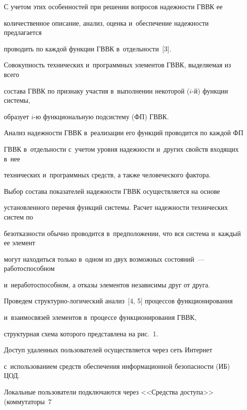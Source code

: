       

      С учетом этих особенностей при решении вопросов надежности ГВВК ее 

количественное описание, анализ, оценка и~обеспечение надежности предлагается 

проводить по каждой функции ГВВК в~отдельности~[3]. 

      

      Совокупность технических и~программных элементов ГВВК, выделяемая из всего 

состава ГВВК по признаку участия в~выполнении некоторой ($i$-й) функции системы, 

образует $i$-ю функциональную подсистему (ФП) ГВВК.

      

      Анализ надежности ГВВК в~реализации его функций проводится по каждой ФП 

ГВВК в~отдельности с~учетом уровня надежности и~других свойств входящих в~нее 

технических и~программных средств, а также человеческого фактора.

      

      Выбор состава показателей надежности ГВВК осуществляется на основе 

установленного перечня функций системы. Расчет надежности технических систем по 

безотказности обычно проводится в~предположении, что вся система и~каждый ее элемент 

могут находиться только в~одном из двух возможных состояний~--- работоспособном 

и~неработоспособном, а отказы элементов независимы друг от друга.

      

      Проведем структурно-логический анализ~[4, 5] процессов функционирования 

и~взаимосвязей элементов в~процессе функционирования ГВВК, 

структурная схема которого  представлена на рис.~1.

      



      

      Доступ удаленных пользователей осуществляется через сеть Интернет 

с~использованием средств обеспечения информационной безопасности (ИБ) ЦОД. 

Локальные пользователи подключаются через <<Средства доступа>> (коммутаторы~7 

